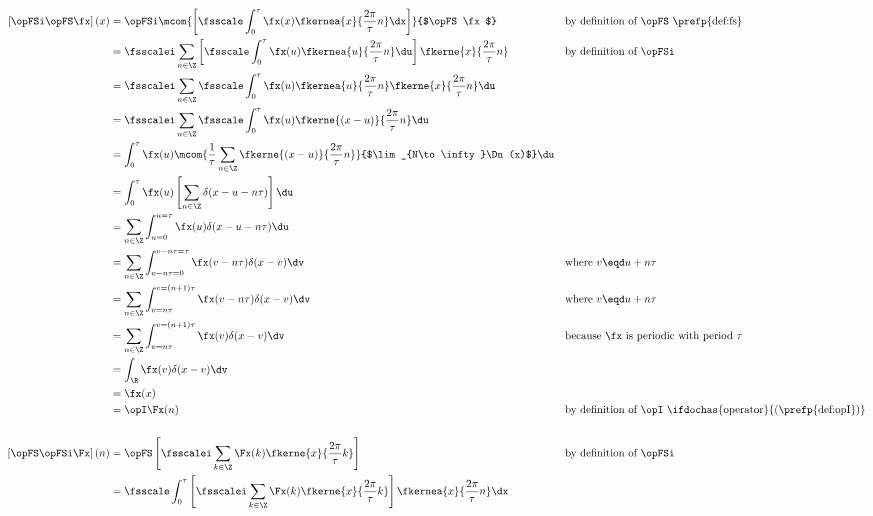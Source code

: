 \begin{proofns}
\begin{align*}
     \left[\opFSi \opFS \fx\right](x)
       &=    \opFSi \mcom{\left[\fsscale \int_0^\tau \fx(x) \fkernea{x}{\frac{2\pi}{\tau}n} \dx\right]}
                         {$\opFS \fx$}
       &&    \text{by definition of $\opFS$ \prefp{def:fs}}
     \\&=    \fsscalei \sum_{n\in\Z} \left[\fsscale\int_0^\tau \fx(u) \fkernea{u}{\frac{2\pi}{\tau}n} \du \right] 
             \fkerne{x}{\frac{2\pi}{\tau}n}
       &&    \text{by definition of $\opFSi$}
     \\&=    \fsscalei \sum_{n\in\Z} \fsscale\int_0^\tau \fx(u) \fkernea{u}{\frac{2\pi}{\tau}n} \fkerne{x}{\frac{2\pi}{\tau}n}\du  
     \\&=    \fsscalei \sum_{n\in\Z} \fsscale\int_0^\tau \fx(u) \fkerne{(x-u)}{\frac{2\pi}{\tau}n} \du  
     \\&=    \int_0^\tau \fx(u) 
             \mcom{\frac{1}{\tau}\sum_{n\in\Z} \fkerne{(x-u)}{\frac{2\pi}{\tau}n}}
                  {$\lim_{N\to\infty}\Dn(x)$} 
             \du  
     \\&=    \int_0^\tau \fx(u) \left[\sum_{n\in\Z} \delta(x-u-n\tau)\right] \du  
     \\&=    \sum_{n\in\Z} \int_{u=0}^{u=\tau} \fx(u) \delta(x-u-n\tau)\du  
     \\&=    \sum_{n\in\Z} \int_{v-n\tau=0}^{v-n\tau=\tau} \fx(v-n\tau) \delta(x-v)\dv  
       &&    \text{where $v\eqd u+n\tau$}
     \\&=    \sum_{n\in\Z} \int_{v=n\tau}^{v=(n+1)\tau} \fx(v-n\tau) \delta(x-v)\dv  
       &&    \text{where $v\eqd u+n\tau$}
     \\&=    \sum_{n\in\Z} \int_{v=n\tau}^{v=(n+1)\tau} \fx(v) \delta(x-v)\dv  
       &&    \text{because $\fx$ is periodic with period $\tau$}
     \\&=    \int_{\R} \fx(v) \delta(x-v)\dv  
     \\&=    \fx(x) 
     \\&=    \opI \Fx(n)
       &&    \text{by definition of $\opI$ \ifdochas{operator}{(\prefp{def:opI})}} 
     \\
     \\
     \left[\opFS \opFSi \Fx\right](n)
       &=    \opFS \left[ \fsscalei\sum_{k\in\Z} \Fx(k) \fkerne{x}{\frac{2\pi}{\tau}k}  \right]
       &&    \text{by definition of $\opFSi$}
     \\&=    \fsscale\int_0^\tau \left[ \fsscalei\sum_{k\in\Z} \Fx(k) \fkerne{x}{\frac{2\pi}{\tau}k}  \right] \fkernea{x}{\frac{2\pi}{\tau}n} \dx

\end{align*}
\end{proofns}
